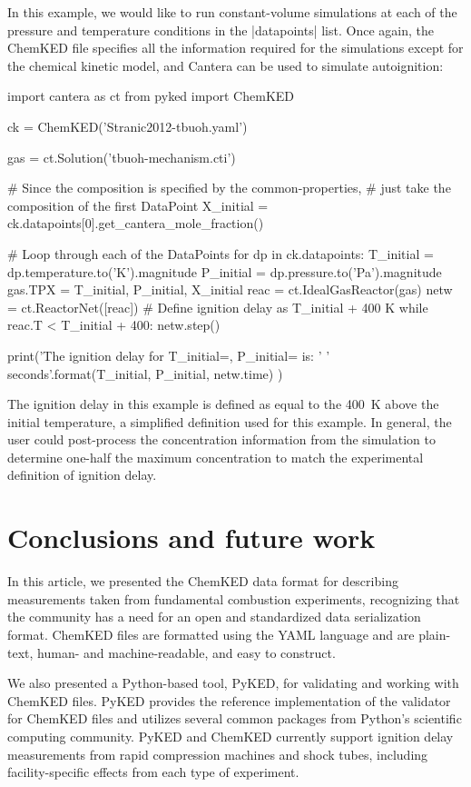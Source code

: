 \documentclass[12pt]{ijck}
\newcommand\ck{ChemKED}
\newcommand\pk{PyKED}
\begin{document}
In this example, we would like to run constant-volume simulations at each of the
pressure and temperature conditions in the \yabox|datapoints| list. Once again,
the \ck{} file specifies all the information required for the simulations except
for the chemical kinetic model, and Cantera can be used to simulate autoignition:
%
\begin{pythonbox}
import cantera as ct
from pyked import ChemKED

ck = ChemKED('Stranic2012-tbuoh.yaml')

gas = ct.Solution('tbuoh-mechanism.cti')

# Since the composition is specified by the common-properties,
# just take the composition of the first DataPoint
X_initial = ck.datapoints[0].get_cantera_mole_fraction()

# Loop through each of the DataPoints
for dp in ck.datapoints:
    T_initial = dp.temperature.to('K').magnitude
    P_initial = dp.pressure.to('Pa').magnitude
    gas.TPX = T_initial, P_initial, X_initial
    reac = ct.IdealGasReactor(gas)
    netw = ct.ReactorNet([reac])
    # Define ignition delay as T_initial + 400 K
    while reac.T < T_initial + 400:
        netw.step()

    print('The ignition delay for T_initial={}, P_initial={} is: '
          '{} seconds'.format(T_initial, P_initial, netw.time)
          )
\end{pythonbox}
%
The ignition delay in this example is defined as equal to the \SI{400}{\kelvin}
above the initial temperature, a simplified definition used for this example.
In general, the user could post-process the concentration information from the
simulation to determine one-half the maximum  concentration to match
the experimental definition of ignition delay.
\section{Conclusions and future work}

In this article, we presented the \ck{} data format for describing measurements
taken from fundamental combustion experiments, recognizing that the community
has a need for an open and standardized data serialization format. \ck{} files
are formatted using the YAML language and are plain-text, human- and
machine-readable, and easy to construct.

We also presented a Python-based tool, \pk{}, for validating and working
with \ck{} files. \pk{} provides the reference implementation of the validator
for \ck{} files and utilizes several common packages from Python's scientific
computing community. \pk{} and \ck{} currently support ignition delay
measurements from rapid compression machines and shock tubes, including
facility-specific effects from each type of experiment.
\end{document}
